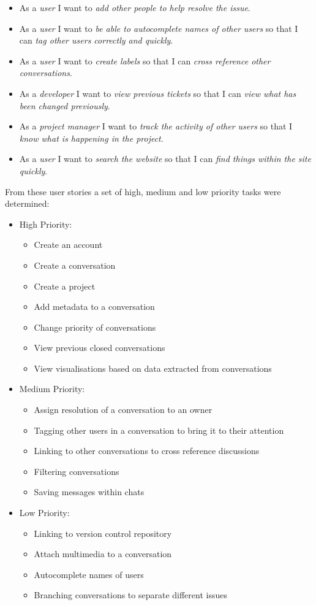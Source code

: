 \documentclass[a4paper]{l3proj}
\begin{document}
\begin{itemize}
\item As a \textit{user} I want to \textit{add other people to help resolve the issue}.
\item As a \textit{user} I want to \textit{be able to autocomplete names of other users} so that I can \textit{tag other users correctly and quickly}.
\item As a \textit{user} I want to \textit{create labels} so that I can \textit{cross reference other conversations}.
\item As a \textit{developer} I want to \textit{view previous tickets} so that I can \textit{view what has been changed previously}.
\item As a \textit{project manager} I want to \textit{track the activity of other users} so that I \textit{know what is happening in the project}.
\item As a \textit{user} I want to \textit{search the website} so that I can \textit{find things within the site quickly}.
\end{itemize}

From these user stories a set of high, medium and low priority tasks were determined:

\begin{itemize}
  \item High Priority:
  \begin{itemize}
    \item Create an account
	\item Create a conversation
	\item Create a project
	\item Add metadata to a conversation
	\item Change priority of conversations
	\item View previous closed conversations
	\item View visualisations based on data extracted from conversations
  \end{itemize}
  \item Medium Priority:
  \begin{itemize}
    \item Assign resolution of a conversation to an owner
	\item Tagging other users in a conversation to bring it to their attention
	\item Linking to other conversations to cross reference discussions
	\item Filtering conversations
	\item Saving messages within chats
  \end{itemize}
  \item Low Priority:
  \begin{itemize}
    \item Linking to version control repository
	\item Attach multimedia to a conversation
	\item Autocomplete names of users
	\item Branching conversations to separate different issues
  \end{itemize}
\end{itemize}
\end{document}
